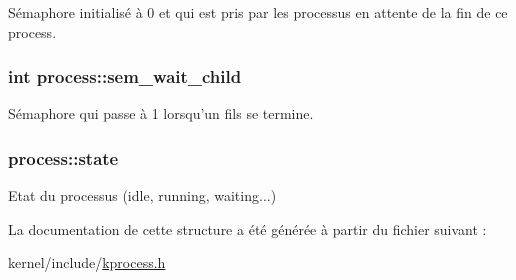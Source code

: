 Sémaphore initialisé à 0 et qui est pris par les processus en attente de la fin de ce process. \hypertarget{structprocess_af6d26a303bcfd1d6fb8249b26aa1b8a8}{
\subsubsection[{sem\+\_\+wait\+\_\+child}]{\setlength{\rightskip}{0pt plus 5cm}int process\+::sem\+\_\+wait\+\_\+child}}\label{structprocess_af6d26a303bcfd1d6fb8249b26aa1b8a8}
Sémaphore qui passe à 1 lorsqu'un fils se termine. \hypertarget{structprocess_adceb5d278a54b128096a76c8405f27d5}{
\subsubsection[{state}]{ process\+::state}}\label{structprocess_adceb5d278a54b128096a76c8405f27d5}
Etat du processus (idle, running, waiting...) 

La documentation de cette structure a été générée à partir du fichier suivant \+:\begin{DoxyCompactItemize}
\item 
kernel/include/\hyperlink{kprocess_8h}{kprocess.\+h}\end{DoxyCompactItemize}
